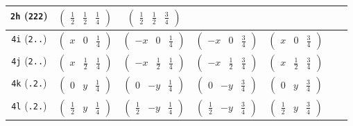 \documentclass[fleqn,9pt,landscape]{jsarticle}
\begin{document}
\begin{center}
\begin{longtable}{ccccccc}
{\tt 2h} ({\tt 222}) & $ \begin{pmatrix} \frac{1}{2} & \frac{1}{2} & \frac{1}{4} \end{pmatrix} $ & $ \begin{pmatrix} \frac{1}{2} & \frac{1}{2} & \frac{3}{4} \end{pmatrix} $ & $  $ & $  $ & $  $ & $  $ \\ \hline
{\tt 4i} ({\tt 2..}) & $ \begin{pmatrix} x & 0 & \frac{1}{4} \end{pmatrix} $ & $ \begin{pmatrix} - x & 0 & \frac{1}{4} \end{pmatrix} $ & $ \begin{pmatrix} - x & 0 & \frac{3}{4} \end{pmatrix} $ & $ \begin{pmatrix} x & 0 & \frac{3}{4} \end{pmatrix} $ & $  $ & $  $ \\ \hline
{\tt 4j} ({\tt 2..}) & $ \begin{pmatrix} x & \frac{1}{2} & \frac{1}{4} \end{pmatrix} $ & $ \begin{pmatrix} - x & \frac{1}{2} & \frac{1}{4} \end{pmatrix} $ & $ \begin{pmatrix} - x & \frac{1}{2} & \frac{3}{4} \end{pmatrix} $ & $ \begin{pmatrix} x & \frac{1}{2} & \frac{3}{4} \end{pmatrix} $ & $  $ & $  $ \\ \hline
{\tt 4k} ({\tt .2.}) & $ \begin{pmatrix} 0 & y & \frac{1}{4} \end{pmatrix} $ & $ \begin{pmatrix} 0 & - y & \frac{1}{4} \end{pmatrix} $ & $ \begin{pmatrix} 0 & - y & \frac{3}{4} \end{pmatrix} $ & $ \begin{pmatrix} 0 & y & \frac{3}{4} \end{pmatrix} $ & $  $ & $  $ \\ \hline
{\tt 4l} ({\tt .2.}) & $ \begin{pmatrix} \frac{1}{2} & y & \frac{1}{4} \end{pmatrix} $ & $ \begin{pmatrix} \frac{1}{2} & - y & \frac{1}{4} \end{pmatrix} $ & $ \begin{pmatrix} \frac{1}{2} & - y & \frac{3}{4} \end{pmatrix} $ & $ \begin{pmatrix} \frac{1}{2} & y & \frac{3}{4} \end{pmatrix} $ & $  $ & $  $ \\ \hline

\end{longtable}
\end{center}
\end{document}
